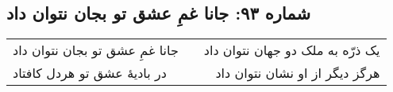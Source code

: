 \begin{center}
\section*{شماره ۹۳: جانا غمِ عشق تو بجان نتوان داد}
\label{sec:093}
\begin{longtable}{l p{0.5cm} r}
جانا غمِ عشق تو بجان نتوان داد
&&
یک ذرّه به ملک دو جهان نتوان داد
\\
در بادیهٔ عشق تو هردل کافتاد
&&
هرگز دیگر از او نشان نتوان داد
\\
\end{longtable}
\end{center}
